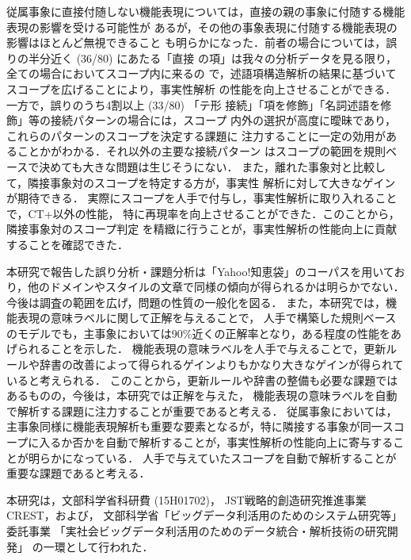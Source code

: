 \documentclass[japanese]{jnlp_1.4}
\begin{document}
従属事象に直接付随しない機能表現については，直接の親の事象に付随する機能表現の影響を受ける可能性が
あるが，その他の事象表現に付随する機能表現の影響はほとんど無視できること
も明らかになった．前者の場合については，誤りの半分近く (36/80) にあたる「直接
の項」は我々の分析データを見る限り，全ての場合においてスコープ内に来るの
で，述語項構造解析の結果に基づいてスコープを広げることにより，事実性解析
の性能を向上させることができる．一方で，誤りのうち4割以上 (33/80) 「テ形
接続」「項を修飾」「名詞述語を修飾」等の接続パターンの場合には，スコープ
内外の選択が高度に曖昧であり，これらのパターンのスコープを決定する課題に
注力することに一定の効用があることかがわかる．それ以外の主要な接続パターン
はスコープの範囲を規則ベースで決めても大きな問題は生じそうにない．
また，離れた事象対と比較して，隣接事象対のスコープを特定する方が，事実性
解析に対して大きなゲインが期待できる．
実際にスコープを人手で付与し，事実性解析に取り入れることで，CT+以外の性能，
特に再現率を向上させることができた．このことから，隣接事象対のスコープ判定
を精緻に行うことが，事実性解析の性能向上に貢献することを確認できた．

本研究で報告した誤り分析・課題分析は「Yahoo!知恵袋」のコーパスを用いてお
り，他のドメインやスタイルの文章で同様の傾向が得られるかは明らかでない．
今後は調査の範囲を広げ，問題の性質の一般化を図る．
また，本研究では，機能表現の意味ラベルに関して正解を与えることで，
人手で構築した規則ベースのモデルでも，主事象においては90\%近くの正解率となり，ある程度の性能をあげられることを示した．
機能表現の意味ラベルを人手で与えることで，更新ルールや辞書の改善によって得られるゲインよりもかなり大きなゲインが得られていると考えられる．
このことから，更新ルールや辞書の整備も必要な課題ではあるものの，今後は，本研究では正解を与えた，
機能表現の意味ラベルを自動で解析する課題に注力することが重要であると考える．
従属事象においては，主事象同様に機能表現解析も重要な要素となるが，特に隣接する事象が同一スコープに入るか否かを自動で解析することが，事実性解析の性能向上に寄与することが明らかになっている．
人手で与えていたスコープを自動で解析することが重要な課題であると考える．






\acknowledgment

本研究は，文部科学省科研費 (15H01702)，
JST戦略的創造研究推進事業CREST，および，
文部科学省「ビッグデータ利活用のためのシステム研究等」委託事業 「実社会ビッグデータ利活用のためのデータ統合・解析技術の研究開発」
の一環として行われた．
\end{document}
